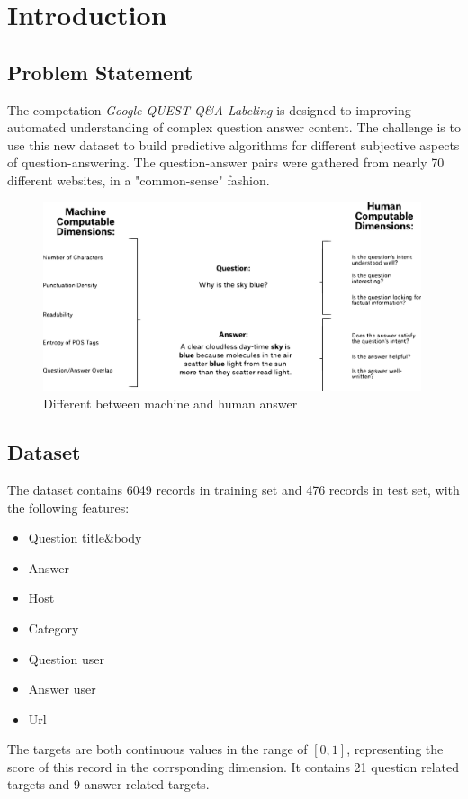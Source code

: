 \section{Introduction}\label{sec-intro}
\subsection{Problem Statement}
The competation \textit{Google QUEST Q\&A Labeling} is designed to 
improving automated understanding of complex question answer content.
The challenge is to use this new dataset to build predictive algorithms for different subjective aspects of question-answering. 
The question-answer pairs were gathered from nearly 70 different websites, in a "common-sense" fashion.
\begin{figure}[htbp]
    \centering
    \includegraphics[width=30em]{figures/title.eps}
    \caption{Different between machine and human answer}
    \label{fig:title}
\end{figure}
\subsection{Dataset}
The dataset contains 6049 records in training set and 476 records in test set, with the following features:
\begin{itemize}
    \item Question title\&body
    \item Answer
    \item Host
    \item Category
    \item Question user
    \item Answer user
    \item Url
\end{itemize}
The targets are both continuous values in the range of $[0,1]$, representing the score of this record in the corrsponding dimension.
It contains 21 question related targets and 9 answer related targets.

